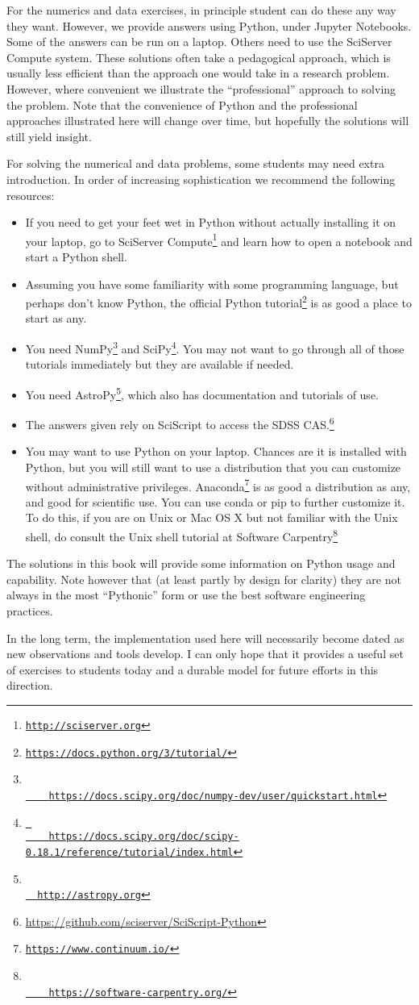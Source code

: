 \documentclass[11pt, preprint, maxnames=9]{aastex}
\begin{document}
For the numerics and data exercises, in principle student can do these
any way they want. However, we provide answers using Python, under
Jupyter Notebooks. Some of the answers can be run on a laptop. Others
need to use the SciServer Compute system.  These solutions often take
a pedagogical approach, which is usually less efficient than the
approach one would take in a research problem.  However, where
convenient we illustrate the ``professional'' approach to solving the
problem. Note that the convenience of Python and the professional
approaches illustrated here will change over time, but hopefully the
solutions will still yield insight.

For solving the numerical and data problems, some students may need
extra introduction. In order of increasing sophistication we recommend
the following resources:
\begin{itemize}
\item If you need to get your feet wet in Python without actually
  installing it on your laptop, go to SciServer
  Compute\footnote{\tt \url{http://sciserver.org}} and learn how to
  open a notebook and start a Python shell.
\item Assuming you have some familiarity with some programming
  language, but perhaps don't know Python, the official Python
  tutorial\footnote{\tt \url{https://docs.python.org/3/tutorial/}} is as
  good a place to start as any.
\item You need 
  NumPy\footnote{\tt \url{
    https://docs.scipy.org/doc/numpy-dev/user/quickstart.html}} and
  SciPy\footnote{\tt \url{ 
    https://docs.scipy.org/doc/scipy-0.18.1/reference/tutorial/index.html}}. You
  may not want to go through all of those tutorials immediately but
  they are available if needed. 
\item You need AstroPy\footnote{\tt \url{
  http://astropy.org}}, which also has documentation and tutorials of
  use.
\item The answers given rely on SciScript to access the SDSS
  CAS.\footnote{\url{https://github.com/sciserver/SciScript-Python}}
\item You may want to use Python on your laptop. Chances are it is
  installed with Python, but you will still want to use a distribution
  that you can customize without administrative
  privileges. Anaconda\footnote{\tt \url{https://www.continuum.io/}} is as
  good a distribution as any, and good for scientific use. You can use
  conda or pip to further customize it. To do this, if you are on Unix
  or Mac OS X but not familiar with the Unix shell, do consult the
  Unix shell tutorial at Software Carpentry\footnote{\tt \url{
    https://software-carpentry.org/}}
\end{itemize}
The solutions in this book will provide some information on Python
usage and capability. Note however that (at least partly by design for
clarity) they are not always in the most ``Pythonic'' form or use the
best software engineering practices.

In the long term, the implementation used here will necessarily become
dated as new observations and tools develop. I can only hope that it
provides a useful set of exercises to students today and a durable
model for future efforts in this direction.
\end{document}
